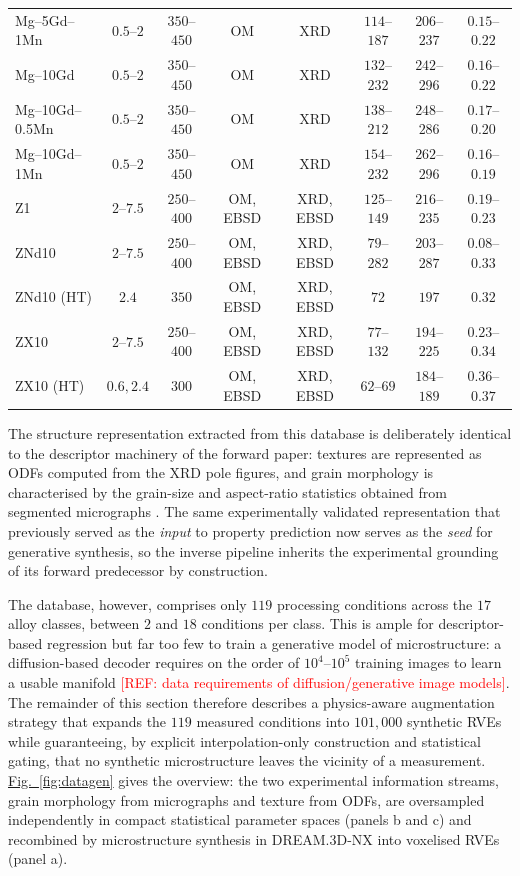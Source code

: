 \documentclass[preprint,12pt]{elsarticle}
\newcommand{\figref}[1]{\hyperref[#1]{Fig.~\ref*{#1}}}
\newcommand{\refneeded}[1]{\textcolor{red}{[REF: #1]}} %
\begin{document}
\begin{table}[!t]
{\begin{tabular}{l c c c c c c c}
Mg--5Gd--1Mn     & $0.5$--$2$ & $350$--$450$ & OM & XRD & $114$--$187$ & $206$--$237$ & $0.15$--$0.22$ \\
Mg--10Gd         & $0.5$--$2$ & $350$--$450$ & OM & XRD & $132$--$232$ & $242$--$296$ & $0.16$--$0.22$ \\
Mg--10Gd--0.5Mn  & $0.5$--$2$ & $350$--$450$ & OM & XRD & $138$--$212$ & $248$--$286$ & $0.17$--$0.20$ \\
Mg--10Gd--1Mn    & $0.5$--$2$ & $350$--$450$ & OM & XRD & $154$--$232$ & $262$--$296$ & $0.16$--$0.19$ \\
Z1               & $2$--$7.5$ & $250$--$400$ & OM, EBSD & XRD, EBSD & $125$--$149$ & $216$--$235$ & $0.19$--$0.23$ \\
ZNd10            & $2$--$7.5$ & $250$--$400$ & OM, EBSD & XRD, EBSD & $79$--$282$  & $203$--$287$ & $0.08$--$0.33$ \\
ZNd10 (HT)       & $2.4$      & $350$       & OM, EBSD & XRD, EBSD & $72$         & $197$        & $0.32$ \\
ZX10             & $2$--$7.5$ & $250$--$400$ & OM, EBSD & XRD, EBSD & $77$--$132$  & $194$--$225$ & $0.23$--$0.34$ \\
ZX10 (HT)        & $0.6, 2.4$ & $300$       & OM, EBSD & XRD, EBSD & $62$--$69$   & $184$--$189$ & $0.36$--$0.37$ \\
\bottomrule
\end{tabular}
}
\end{table}

The structure representation extracted from this database is deliberately identical to the descriptor machinery of the forward paper: textures are represented as ODFs computed from the XRD pole figures, and grain morphology is characterised by the grain-size and aspect-ratio statistics obtained from segmented micrographs \cite{Guru2025}. The same experimentally validated representation that previously served as the \emph{input} to property prediction now serves as the \emph{seed} for generative synthesis, so the inverse pipeline inherits the experimental grounding of its forward predecessor by construction.

The database, however, comprises only $119$ processing conditions across the $17$ alloy classes, between $2$ and $18$ conditions per class. This is ample for descriptor-based regression but far too few to train a generative model of microstructure: a diffusion-based decoder requires on the order of $10^{4}$--$10^{5}$ training images to learn a usable manifold \refneeded{data requirements of diffusion/generative image models}. The remainder of this section therefore describes a physics-aware augmentation strategy that expands the $119$ measured conditions into $101{,}000$ synthetic RVEs while guaranteeing, by explicit interpolation-only construction and statistical gating, that no synthetic microstructure leaves the vicinity of a measurement. \figref{fig:datagen} gives the overview: the two experimental information streams, grain morphology from micrographs and texture from ODFs, are oversampled independently in compact statistical parameter spaces (panels b and c) and recombined by microstructure synthesis in DREAM.3D-NX \cite{groeber2014} into voxelised RVEs (panel a).
\end{document}
